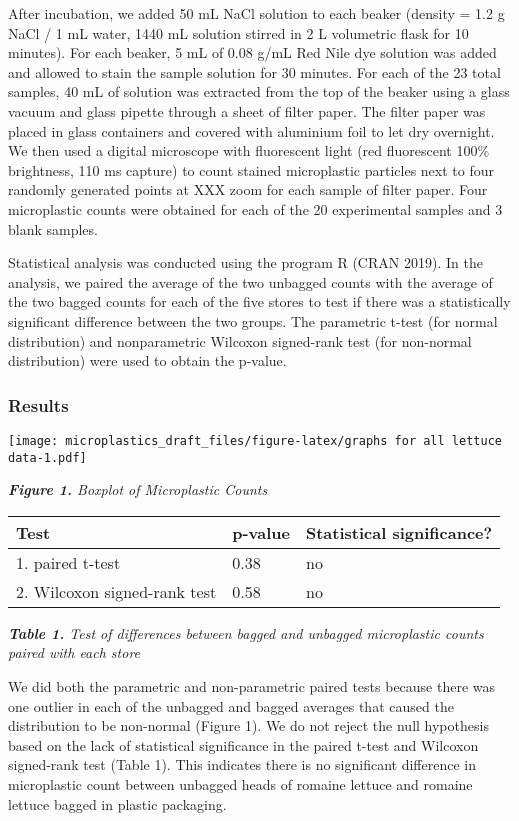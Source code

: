 \documentclass[]{article}
\begin{document}
After incubation, we added 50 mL NaCl solution to each beaker (density =
1.2 g NaCl / 1 mL water, 1440 mL solution stirred in 2 L volumetric
flask for 10 minutes). For each beaker, 5 mL of 0.08 g/mL Red Nile dye
solution was added and allowed to stain the sample solution for 30
minutes. For each of the 23 total samples, 40 mL of solution was
extracted from the top of the beaker using a glass vacuum and glass
pipette through a sheet of filter paper. The filter paper was placed in
glass containers and covered with aluminium foil to let dry overnight.
We then used a digital microscope with fluorescent light (red
fluorescent 100\% brightness, 110 ms capture) to count stained
microplastic particles next to four randomly generated points at XXX
zoom for each sample of filter paper. Four microplastic counts were
obtained for each of the 20 experimental samples and 3 blank samples.

Statistical analysis was conducted using the program R (CRAN 2019). In
the analysis, we paired the average of the two unbagged counts with the
average of the two bagged counts for each of the five stores to test if
there was a statistically significant difference between the two groups.
The parametric t-test (for normal distribution) and nonparametric
Wilcoxon signed-rank test (for non-normal distribution) were used to
obtain the p-value.

\hypertarget{results}{%
\subsubsection{Results}\label{results}}

\texttt{[image: microplastics\_draft\_files/figure-latex/graphs for all lettuce data-1.pdf]}

\emph{\textbf{Figure 1.} Boxplot of Microplastic Counts}

\begin{longtable}[]{@{}lll@{}}
\toprule
Test & p-value & Statistical significance?\tabularnewline
\midrule
\endhead
1. paired t-test & 0.38 & no\tabularnewline
2. Wilcoxon signed-rank test & 0.58 & no\tabularnewline
\bottomrule
\end{longtable}

\emph{\textbf{Table 1.} Test of differences between bagged and unbagged
microplastic counts paired with each store}

We did both the parametric and non-parametric paired tests because there
was one outlier in each of the unbagged and bagged averages that caused
the distribution to be non-normal (Figure 1). We do not reject the null
hypothesis based on the lack of statistical significance in the paired
t-test and Wilcoxon signed-rank test (Table 1). This indicates there is
no significant difference in microplastic count between unbagged heads
of romaine lettuce and romaine lettuce bagged in plastic packaging.
\end{document}
